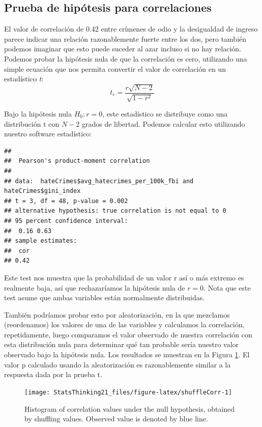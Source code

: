 \documentclass[
  12pt,
]{book}
\begin{document}
\hypertarget{prueba-de-hipuxf3tesis-para-correlaciones}{%
\subsection{Prueba de hipótesis para correlaciones}\label{prueba-de-hipuxf3tesis-para-correlaciones}}

El valor de correlación de 0.42 entre crímenes de odio y la desigualdad de ingreso parece indicar una relación razonablemente fuerte entre los dos, pero también podemos imaginar que esto puede suceder al azar incluso si no hay relación. Podemos probar la hipótesis nula de que la correlación es cero, utilizando una simple ecuación que nos permita convertir el valor de correlación en un estadístico \emph{t}:
\[
\textit{t}_r =  \frac{r\sqrt{N-2}}{\sqrt{1-r^2}}
\]

Bajo la hipótesis nula \(H_0:r=0\), este estadístico se distribuye como una distribución t con \(N - 2\) grados de libertad. Podemos calcular esto utilizando nuestro software estadístico:

\begin{verbatim}
## 
## 	Pearson's product-moment correlation
## 
## data:  hateCrimes$avg_hatecrimes_per_100k_fbi and hateCrimes$gini_index
## t = 3, df = 48, p-value = 0.002
## alternative hypothesis: true correlation is not equal to 0
## 95 percent confidence interval:
##  0.16 0.63
## sample estimates:
##  cor 
## 0.42
\end{verbatim}

Este test nos muestra que la probabilidad de un valor r así o más extremo es realmente baja, así que rechazaríamos la hipótesis nula de \(r=0\). Nota que este test asume que ambas variables están normalmente distribuidas.

También podríamos probar esto por aleatorización, en la que mezclamos (reordenamos) los valores de una de las variables y calculamos la correlación, repetidamente, luego comparamos el valor observado de nuestra correlación con esta distribución nula para determinar qué tan probable sería nuestro valor observado bajo la hipótesis nula. Los resultados se muestran en la Figura \ref{fig:shuffleCorr}. El valor p calculado usando la aleatorización es razonablemente similar a la respuesta dada por la prueba t.

\begin{figure}
\texttt{[image: StatsThinking21\_files/figure-latex/shuffleCorr-1]} \caption{Histogram of correlation values under the null hypothesis, obtained by shuffling values. Observed value is denoted by blue line.}\label{fig:shuffleCorr}
\end{figure}
\end{document}
